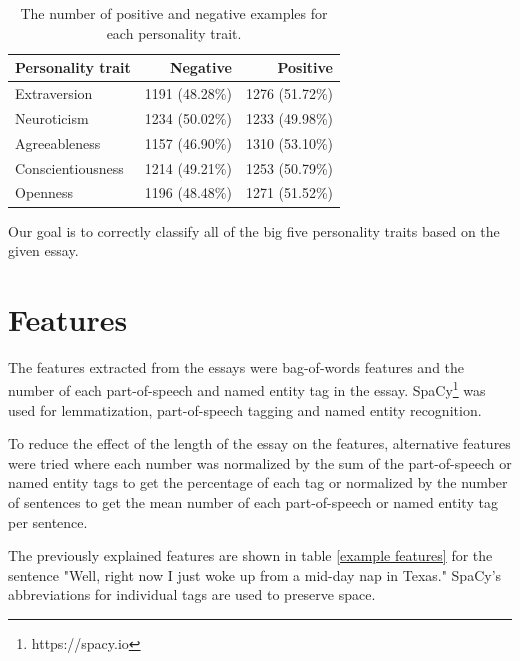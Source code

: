 \documentclass[10pt, a4paper]{article}
\begin{document}
\begin{table}[H]
	\centering
	\begin{tabular}{lrr}
		\hline
		Personality trait & Negative & Positive \\ \hline
		Extraversion                                  & 1191 (48.28\%)                         & 1276 (51.72\%)                         \\
		Neuroticism                                  & 1234 (50.02\%)                         & 1233 (49.98\%)                         \\
		Agreeableness                                  & 1157 (46.90\%)                         & 1310 (53.10\%)                         \\
		Conscientiousness                                  & 1214 (49.21\%)                         & 1253 (50.79\%)                         \\
		Openness                                  & 1196 (48.48\%)                         & 1271 (51.52\%)                         \\ \hline
	\end{tabular}
	\caption{The number of positive and negative examples for each personality trait.}
	\label{positive negative examples}
\end{table}

Our goal is to correctly classify all of the big five personality traits based on the given essay.

\section{Features}

The features extracted from the essays were bag-of-words features and the number of each part-of-speech and named entity tag in the essay.
SpaCy\footnote{https://spacy.io} was used for lemmatization, part-of-speech tagging and named entity recognition.

To reduce the effect of the length of the essay on the features, alternative features were tried where each number was normalized by the sum of the part-of-speech or named entity tags to get the percentage of each tag or normalized by the number of sentences to get the mean number of each part-of-speech or named entity tag per sentence.

The previously explained features are shown in table \ref{example features} for the sentence "Well, right now I just woke up from a mid-day nap in Texas."
SpaCy's abbreviations for individual tags are used to preserve space.
\end{document}
